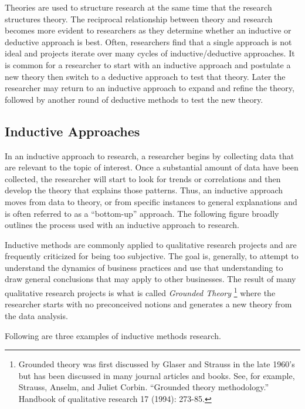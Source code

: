 \documentclass[]{book}
\let\rmarkdownfootnote\footnote%
\def\footnote{\protect\rmarkdownfootnote}
\theoremstyle{definition}
\theoremstyle{definition}
\theoremstyle{definition}
\theoremstyle{remark}
\begin{document}
Theories are used to structure research at the same time that the
research structures theory. The reciprocal relationship between theory
and research becomes more evident to researchers as they determine
whether an inductive or deductive approach is best. Often, researchers
find that a single approach is not ideal and projects iterate over many
cycles of inductive/deductive approaches. It is common for a researcher
to start with an inductive approach and postulate a new theory then
switch to a deductive approach to test that theory. Later the researcher
may return to an inductive approach to expand and refine the theory,
followed by another round of deductive methods to test the new theory.

\hypertarget{inductive-approaches}{%
\subsection{Inductive Approaches}\label{inductive-approaches}}

In an inductive approach to research, a researcher begins by collecting
data that are relevant to the topic of interest. Once a substantial
amount of data have been collected, the researcher will start to look
for trends or correlations and then develop the theory that explains
those patterns. Thus, an inductive approach moves from data to theory,
or from specific instances to general explanations and is often referred
to as a ``bottom-up'' approach. The following figure broadly outlines
the process used with an inductive approach to research.

Inductive methods are commonly applied to qualitative research projects
and are frequently criticized for being too subjective. The goal is,
generally, to attempt to understand the dynamics of business practices
and use that understanding to draw general conclusions that may apply to
other businesses. The result of many qualitative research projects is
what is called \emph{Grounded Theory} \footnote{Grounded theory was
  first discussed by Glaser and Strauss in the late 1960's but has been
  discussed in many journal articles and books. See, for example,
  Strauss, Anselm, and Juliet Corbin. ``Grounded theory methodology.''
  Handbook of qualitative research 17 (1994): 273-85.} where the
researcher starts with no preconceived notions and generates a new
theory from the data analysis.

Following are three examples of inductive methods research.
\end{document}

